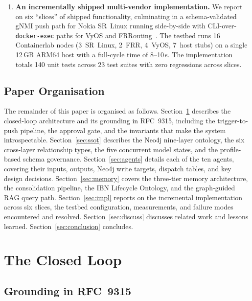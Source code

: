 \documentclass[acmtog]{acmart}
\renewcommand\_{\textunderscore\allowbreak}
\begin{document}
\begin{enumerate}[label=\textbf{C\arabic*.}]
  \item \textbf{An incrementally shipped multi-vendor implementation.}
    We report on six ``slices'' of shipped functionality, culminating
    in a schema-validated gNMI push path for Nokia SR~Linux running
    side-by-side with CLI-over-\texttt{docker-exec} paths for VyOS
    and FRRouting~\cite{frr}. The testbed runs 16 Containerlab nodes
    (3~SR~Linux, 2~FRR, 4~VyOS, 7~host stubs) on a single 12\,GB
    ARM64 host with a full-cycle time of 8--10\,s. The implementation
    totals 140 unit tests across 23 test suites with zero regressions
    across slices.
\end{enumerate}

\subsection{Paper Organisation}

The remainder of this paper is organised as follows.
Section~\ref{sec:cl} describes the closed-loop architecture and its
grounding in RFC~9315, including the trigger-to-push pipeline, the
approval gate, and the invariants that make the system introspectable.
Section~\ref{sec:ssot} describes the Neo4j nine-layer ontology, the six
cross-layer relationship types, the five concurrent model states, and
the profile-based schema governance.
Section~\ref{sec:agents} details each of the ten agents, covering their
inputs, outputs, Neo4j write targets, dispatch tables, and key design
decisions.
Section~\ref{sec:memory} covers the three-tier memory architecture,
the consolidation pipeline, the IBN Lifecycle Ontology, and the
graph-guided RAG query path.
Section~\ref{sec:impl} reports on the incremental implementation across
six slices, the testbed configuration, measurements, and failure modes
encountered and resolved.
Section~\ref{sec:discuss} discusses related work and lessons learned.
Section~\ref{sec:conclusion} concludes.


\section{The Closed Loop}\label{sec:cl}

\subsection{Grounding in RFC~9315}\label{sec:cl:rfc}
\end{document}
